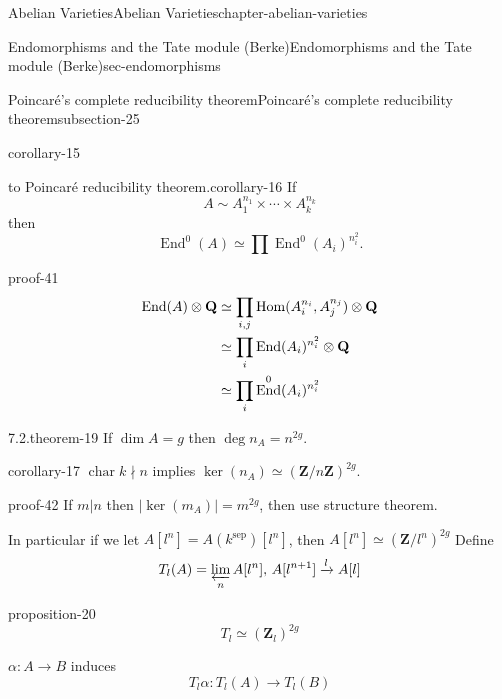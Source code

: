 \documentclass[oneside,10pt,]{book}
\renewcommand{\qedhere}{\relax}
\numberwithin{equation}{section}
\newcommand{\lb}{[}
\newcommand{\rb}{]}
\newcommand{\ZZ}{\mathbf{Z}}
\newcommand{\QQ}{\mathbf{Q}}
\newcommand{\sep}{\mathrm{sep}}
\DeclareMathOperator{\End}{End}
\DeclareMathOperator{\Hom}{Hom}
\DeclareMathOperator{\characteristic}{char}
\newcommand{\amp}{&}
\begin{document}
\begin{chapterptx}{Abelian Varieties}{}{Abelian Varieties}{}{}{chapter-abelian-varieties}
\begin{sectionptx}{Endomorphisms and the Tate module (Berke)}{}{Endomorphisms and the Tate module (Berke)}{}{}{sec-endomorphisms}
\begin{subsectionptx}{Poincaré's complete reducibility theorem}{}{Poincaré's complete reducibility theorem}{}{}{subsection-25}
\begin{corollary}{}{}{corollary-15}
\end{corollary}
\begin{corollary}{to Poincaré reducibility theorem.}{}{corollary-16}%
\hypertarget{p-221}{}%
If%
\begin{equation*}
A\sim A_1^{n_1} \times \cdots \times A_k^{n_k}
\end{equation*}
then%
\begin{equation*}
\End^0(A) \simeq \prod \End^0(A_i)^{n_i^2}\text{.}
\end{equation*}
%
\end{corollary}
\begin{proofptx}{}{proof-41}
\hypertarget{p-222}{}%
%
\begin{align*}
\End(A) \otimes \QQ \amp \simeq \prod_{i,j} \Hom(A_i^{n_i}, A_j^{n_j}) \otimes \QQ\\
\amp \simeq \prod_{i} \End(A_i)^{n_i^2} \otimes \QQ\\
\amp \simeq \prod_{i} \End^0(A_i)^{n_i^2}\qedhere
\end{align*}
%
\end{proofptx}
\begin{theorem}{7.2.}{}{theorem-19}%
\hypertarget{p-223}{}%
If \(\dim A = g\) then \(\deg n_A  =n^{2g}\).%
\end{theorem}
\begin{corollary}{}{}{corollary-17}%
\hypertarget{p-224}{}%
\(\characteristic k \nmid n\) implies \(\ker(n_A) \simeq (\ZZ/n\ZZ)^{2g}\).%
\end{corollary}
\begin{proofptx}{}{proof-42}
\hypertarget{p-225}{}%
If  \(m | n\) then \(|\ker (m_A)| = m^{2g}\), then use structure theorem.%
\end{proofptx}
\hypertarget{p-226}{}%
In particular if we let \(A\lb l^n\rb = A(k^\sep) \lb l^n\rb\), then \(A\lb l^n\rb \simeq (\ZZ/l^n)^{2g}\) Define%
\begin{equation*}
T_l(A) = \varprojlim_n A[l^n],\, A[l^{n+1}] \xrightarrow{l} A[l]
\end{equation*}
%
\begin{proposition}{}{}{proposition-20}%
\hypertarget{p-227}{}%
%
\begin{equation*}
T_l \simeq (\ZZ_l)^{2g}
\end{equation*}
%
\end{proposition}
\hypertarget{p-228}{}%
\(\alpha \colon A \to B\) induces%
\begin{equation*}
T_l\alpha\colon T_l(A) \to T_l(B)
\end{equation*}
%
\begin{equation*}

\end{equation*}
\end{subsectionptx}
\end{sectionptx}
\end{chapterptx}
\end{document}
